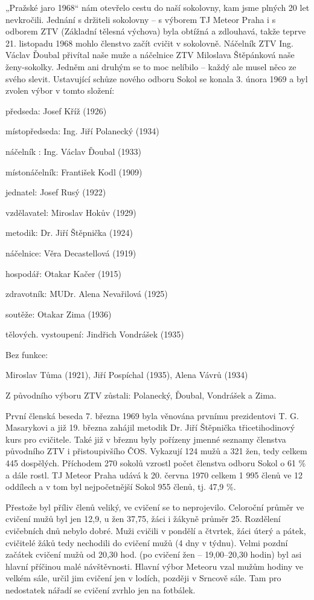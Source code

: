 „Pražské jaro 1968`` nám otevřelo cestu do naší sokolovny, kam jsme
plných 20 let nevkročili. Jednání s držiteli sokolovny -- s výborem TJ
Meteor Praha i s odborem ZTV (Základní tělesná výchova) byla obtížná a
zdlouhavá, takže teprve 21. listopadu 1968 mohlo členstvo začít cvičit v
sokolovně. Náčelník ZTV Ing. Václav Ďoubal přivítal naše muže a
náčelnice ZTV Miloslava Štěpánková naše ženy-sokolky. Jedněm ani druhým
se to moc nelíbilo -- každý ale musel něco ze svého slevit. Ustavující
schůze nového odboru Sokol se konala 3. února 1969 a byl zvolen výbor v
tomto složení:

předseda: Josef Kříž (1926)

místopředseda: Ing. Jiří Polanecký (1934)

náčelník : Ing. Václav Ďoubal (1933)

místonáčelník: František Kodl (1909)

jednatel: Josef Rusý (1922)

vzdělavatel: Miroslav Hokův (1929)

metodik: Dr. Jiří Štěpnička (1924)

náčelnice: Věra Decastellová (1919)

hospodář: Otakar Kačer (1915)

zdravotník: MUDr. Alena Nevařilová (1925)

soutěže: Otakar Zima (1936)

tělových. vystoupení: Jindřich Vondrášek (1935)

Bez funkce:

Miroslav Tůma (1921), Jiří Pospíchal (1935), Alena Vávrů (1934)

Z původního výboru ZTV zůstali: Polanecký, Ďoubal, Vondrášek a Zima.

První členská beseda 7. března 1969 byla věnována prvnímu prezidentovi
T. G. Masarykovi a již 19. března zahájil metodik Dr. Jiří Štěpnička
třicetihodinový kurs pro cvičitele. Také již v březnu byly pořízeny
jmenné seznamy členstva původního ZTV i přistoupivšího ČOS. Vykazují 124
mužů a 321 žen, tedy celkem 445 dospělých. Příchodem 270 sokolů vzrostl
počet členstva odboru Sokol o 61 \% a dále rostl. TJ Meteor Praha udává
k 20. června 1970 celkem 1 995 členů ve 12 oddílech a v tom byl
nejpočetnější Sokol 955 členů, tj. 47,9 \%.

Přestože byl příliv členů veliký, ve cvičení se to neprojevilo.
Celoroční průměr ve cvičení mužů byl jen 12,9, u žen 37,75, žáci i
žákyně průměr 25. Rozdělení cvičebních dnů nebylo dobré. Muži cvičili v
pondělí a čtvrtek, žáci úterý a pátek, cvičitelé žáků tedy nechodili do
cvičení mužů (4 dny v týdnu). Velmi pozdní začátek cvičení mužů od 20,30
hod. (po cvičení žen --⁠⁠⁠⁠⁠⁠ 19,00--⁠⁠⁠⁠⁠⁠20,30 hodin) byl asi hlavní příčinou malé
návštěvnosti. Hlavní výbor Meteoru vzal mužům hodiny ve velkém sále,
určil jim cvičení jen v lodích, později v Srncově sále. Tam pro
nedostatek nářadí se cvičení zvrhlo jen na fotbálek.

